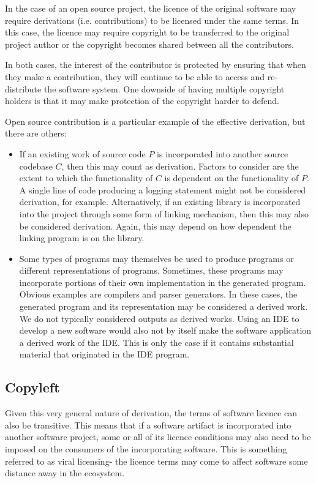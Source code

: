 \documentclass[a4paper, openany]{memoir}
\begin{document}
In the case of an open source project, the licence of the original software may require derivations (i.e. contributions) to be licensed under the same terms. In this case, the licence may require copyright to be transferred to the original project author or the copyright becomes shared between all the contributors.

In both cases, the interest of the contributor is protected by ensuring that when they make a contribution, they will continue to be able to access and re-distribute the software system. One downside of having multiple copyright holders is that it may make protection of the copyright harder to defend.

Open source contribution is a particular example of the effective derivation, but there are others:
\begin{itemize}
    \item If an existing work of source code $P$ is incorporated into another source codebase $C$, then this may count as derivation. Factors to consider are the extent to which the functionality of $C$ is dependent on the functionality of $P$. A single line of code producing a logging statement might not be considered derivation, for example. Alternatively, if an existing library is incorporated into the project through some form of linking mechanism, then this may also be considered derivation. Again, this may depend on how dependent the linking program is on the library.
    
    \item Some types of programs may themselves be used to produce programs or different representations of programs. Sometimes, these programs may incorporate portions of their own implementation in the generated program. Obvious examples are compilers and parser generators. In these cases, the generated program and its representation may be considered a derived work. We do not typically considered outputs as derived works. Using an IDE to develop a new software would also not by itself make the software application a derived work of the IDE. This is only the case if it contains substantial material that originated in the IDE program.
\end{itemize}

\subsection{Copyleft}
Given this very general nature of derivation, the terms of software licence can also be transitive. This means that if a software artifact is incorporated into another software project, some or all of its licence conditions may also need to be imposed on the consumers of the incorporating software. This is something referred to as viral licensing- the licence terms may come to affect software some distance away in the ecosystem.
\end{document}
